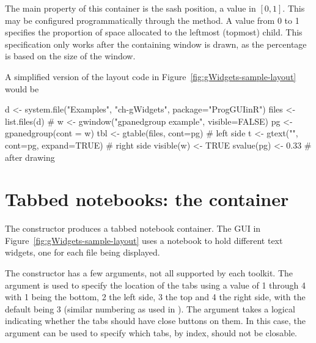 The main property of this container is the sash position, a value in
$[0,1]$. This may be configured programmatically through the
 method. A value from 0 to 1
specifies the proportion of space allocated to the leftmost (topmost)
child. This specification only works after the containing window is
drawn, as the percentage is based on the size of the window.


A simplified version of the layout code in
Figure~\ref{fig:gWidgets-sample-layout} would be
\begin{Schunk}
\begin{Sinput}
 d <- system.file("Examples", "ch-gWidgets", 
                  package="ProgGUIinR")
 files <- list.files(d)
 #
 w <- gwindow("gpanedgroup example", visible=FALSE)
 pg <- gpanedgroup(cont = w)
 tbl <- gtable(files, cont=pg)           # left side
 t <- gtext("", cont=pg, expand=TRUE)    # right side
 visible(w) <- TRUE
 svalue(pg) <- 0.33                      # after drawing
\end{Sinput}
\end{Schunk}




  
\section{Tabbed notebooks: the  container}
\label{sec:gWidgets-gnotebook}

The  constructor produces a tabbed notebook
container. The GUI in Figure~\ref{fig:gWidgets-sample-layout} uses a
notebook to hold different text widgets, one for each file being displayed.

The constructor has a few arguments, not all supported by each
toolkit. The argument  is used to specify
the location of the tabs using a value of 1 through 4 with 1 being
the bottom, 2 the left side, 3 the top and 4 the right side, with the
default being 3 (similar numbering as used in ). The
 argument takes a logical indicating
whether the tabs should have close buttons on them. In this case, the
argument  can be used to specify
which tabs, by index, should not be closable.



